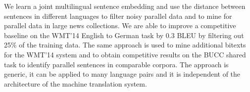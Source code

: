We learn a joint multilingual sentence embedding and use the distance between sentences in different languages to filter noisy parallel data and to mine for parallel data in large news collections.  We are able to improve a competitive baseline on the WMT'14 English to German task by 0.3 BLEU by filtering out 25\% of the training data.  The same approach is used to mine additional bitexts for the WMT'14 system and to obtain competitive results on the BUCC shared task to identify parallel sentences in comparable corpora. The approach is generic, it can be applied to many language pairs and it is independent of the architecture of the machine translation system.
